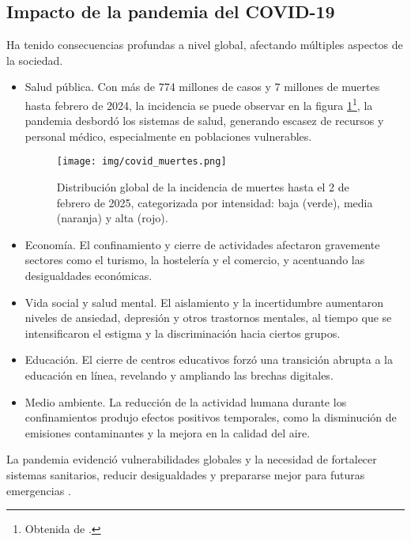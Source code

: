 \subsection{Impacto de la pandemia del COVID-19}
Ha tenido consecuencias profundas a nivel global, afectando múltiples aspectos de la sociedad. 
\begin{itemize}
\item Salud pública. Con más de 774 millones de casos y 7 millones de muertes hasta febrero de 2024, la incidencia se puede observar en la figura \ref{fig:muertes covid}\footnote{Obtenida de \cite{elpais_covidmap}.}, la pandemia desbordó los sistemas de salud, generando escasez de recursos y personal médico, especialmente en poblaciones vulnerables.
\begin{figure}[H]
        \centering
        \texttt{[image: img/covid\_muertes.png]}
        \caption{Distribución global de la incidencia de muertes hasta el 2 de febrero de 2025, categorizada por intensidad: baja (verde), media (naranja) y alta (rojo).}
        \label{fig:muertes covid}
        \vspace{0.5cm} %
\end{figure}

    \item Economía. El confinamiento y cierre de actividades afectaron gravemente sectores como el turismo, la hostelería y el comercio, y acentuando las desigualdades económicas.
    \item Vida social y salud mental. El aislamiento y la incertidumbre aumentaron niveles de ansiedad, depresión y otros trastornos mentales, al tiempo que se intensificaron el estigma y la discriminación hacia ciertos grupos.
    \item Educación. El cierre de centros educativos forzó una transición abrupta a la educación en línea, revelando y ampliando las brechas digitales.
    \item Medio ambiente. La reducción de la actividad humana durante los confinamientos produjo efectos positivos temporales, como la disminución de emisiones contaminantes y la mejora en la calidad del aire.
\end{itemize}

La pandemia evidenció vulnerabilidades globales y la necesidad de fortalecer sistemas sanitarios, reducir desigualdades y prepararse mejor para futuras emergencias \cite{miyah2022covid}.

